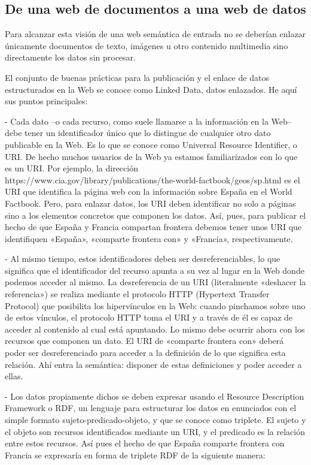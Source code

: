 \subsection{De una web de documentos a una web de datos}

Para alcanzar esta visión de una web semántica de entrada no se deberían enlazar únicamente documentos de texto, imágenes u otro contenido multimedia sino directamente los datos sin procesar.

El conjunto de buenas prácticas para la publicación y el enlace de datos estructurados en la Web se conoce como Linked Data, datos enlazados. He aquí sus puntos principales:


- Cada dato –o cada recurso, como suele llamarse a la información en la Web– debe tener un identificador único que lo distingue de cualquier otro dato publicable en la Web. Es lo que se conoce como Universal Resource Identifier, o URI. De hecho muchos usuarios de la Web ya estamos familiarizados con lo que es un URI. Por ejemplo, la dirección https://www.cia.gov/library/publications/the-world-factbook/geos/sp.html es el URI que identifica la página web con la información sobre España en el World Factbook. Pero, para enlazar datos, los URI deben identificar no solo a páginas sino a los elementos concretos que componen los datos. Así, pues, para publicar el hecho de que España y Francia compartan frontera debemos tener unos URI que identifiquen «España», «comparte frontera con» y «Francia», respectivamente.

- Al mismo tiempo, estos identificadores deben ser desreferenciables, lo que significa que el identificador del recurso apunta a su vez al lugar en la Web donde podemos acceder al mismo. La desreferencia de un URI (literalmente «deshacer la referencia») se realiza mediante el protocolo HTTP (Hypertext Transfer Protocol) que posibilita los hipervínculos en la Web: cuando pinchamos sobre uno de estos vínculos, el protocolo HTTP toma el URI y a través de él es capaz de acceder al contenido al cual está apuntando. Lo mismo debe ocurrir ahora con los recursos que componen un dato. El URI de «comparte frontera con» deberá poder ser desreferenciado para acceder a la definición de lo que significa esta relación. Ahí entra la semántica: disponer de estas definiciones y poder acceder a ellas.

- Los datos propiamente dichos se deben expresar usando el Resource Description Framework o RDF, un lenguaje para estructurar los datos en enunciados con el simple formato sujeto-predicado-objeto, y que se conoce como triplete. El sujeto y el objeto son recursos identificados mediante un URI, y el predicado es la relación entre estos recursos. Así pues el hecho de que España comparte frontera con Francia se expresaría en forma de triplete RDF de la siguiente manera:

